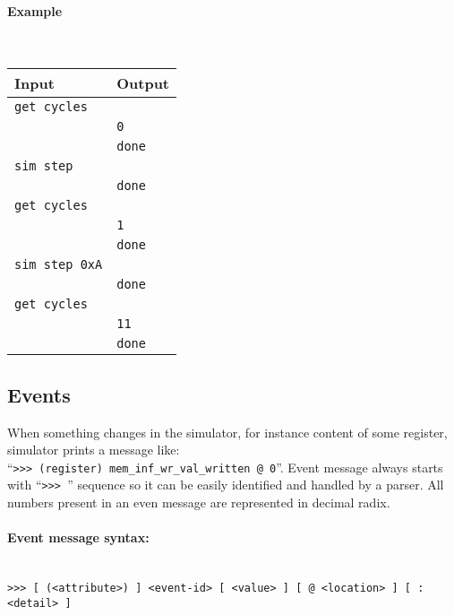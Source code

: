         \paragraph{Example}~\\
            \begin{tabular}{l|l}
                \textbf{Input}          & \textbf{Output} \\
                \hline
                \verb'get cycles'       & \\
                                        & \verb'0'\\
                                        & \verb'done'\\
                \hline
                \verb'sim step'         & \\
                                        & \verb'done'\\
                \hline
                \verb'get cycles'       & \\
                                        & \verb'1'\\
                                        & \verb'done'\\
                \hline
                \verb'sim step 0xA'     & \\
                                        & \verb'done'\\
                \hline
                \verb'get cycles'       & \\
                                        & \verb'11'\\
                                        & \verb'done'\\
            \end{tabular}

    \subsection{Events}
        When something changes in the simulator, for instance content of some register, simulator prints a message like: ``\texttt{>{}>{}>~(register)~mem\_inf\_wr\_val\_written~@~0}''. Event message always starts with ``\texttt{>{}>{}> }'' sequence so it can be easily identified and handled by a parser. All numbers present in an even message are represented in decimal radix.

        \paragraph{Event message syntax:}~\\
            \verb'>>> [ (<attribute>) ] <event-id> [ <value> ] [ @ <location> ] [ : <detail> ]'\\

